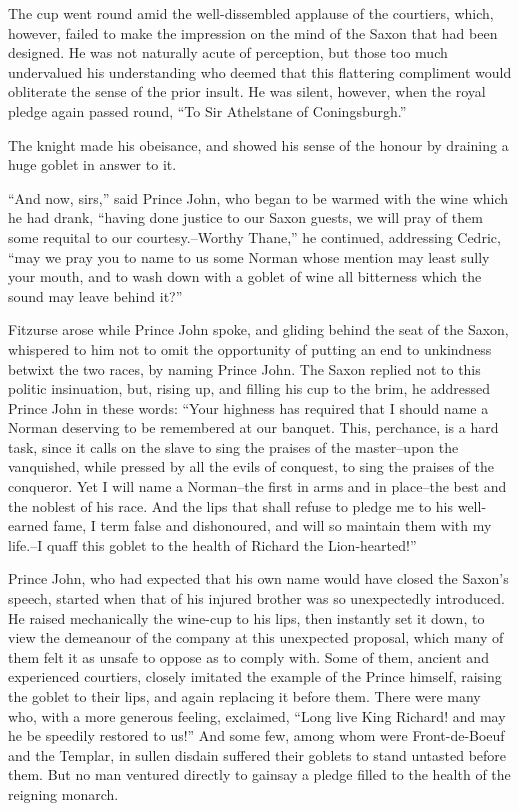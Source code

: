 The cup went round amid the well-dissembled applause of the courtiers,
which, however, failed to make the impression on the mind of the Saxon
that had been designed. He was not naturally acute of perception, but
those too much undervalued his understanding who deemed that this
flattering compliment would obliterate the sense of the prior insult. He
was silent, however, when the royal pledge again passed round, ``To Sir
Athelstane of Coningsburgh.''

The knight made his obeisance, and showed his sense of the honour by
draining a huge goblet in answer to it.

``And now, sirs,'' said Prince John, who began to be warmed with the
wine which he had drank, ``having done justice to our Saxon guests, we
will pray of them some requital to our courtesy.--Worthy Thane,'' he
continued, addressing Cedric, ``may we pray you to name to us some
Norman whose mention may least sully your mouth, and to wash down with a
goblet of wine all bitterness which the sound may leave behind it?''

Fitzurse arose while Prince John spoke, and gliding behind the seat of
the Saxon, whispered to him not to omit the opportunity of putting an
end to unkindness betwixt the two races, by naming Prince John. The
Saxon replied not to this politic insinuation, but, rising up, and
filling his cup to the brim, he addressed Prince John in these words:
``Your highness has required that I should name a Norman deserving to be
remembered at our banquet. This, perchance, is a hard task, since it
calls on the slave to sing the praises of the master--upon the
vanquished, while pressed by all the evils of conquest, to sing the
praises of the conqueror. Yet I will name a Norman--the first in arms
and in place--the best and the noblest of his race. And the lips that
shall refuse to pledge me to his well-earned fame, I term false and
dishonoured, and will so maintain them with my life.--I quaff this
goblet to the health of Richard the Lion-hearted!''

Prince John, who had expected that his own name would have closed the
Saxon's speech, started when that of his injured brother was so
unexpectedly introduced. He raised mechanically the wine-cup to his
lips, then instantly set it down, to view the demeanour of the company
at this unexpected proposal, which many of them felt it as unsafe to
oppose as to comply with. Some of them, ancient and experienced
courtiers, closely imitated the example of the Prince himself, raising
the goblet to their lips, and again replacing it before them. There were
many who, with a more generous feeling, exclaimed, ``Long live King
Richard! and may he be speedily restored to us!'' And some few, among
whom were Front-de-Boeuf and the Templar, in sullen disdain suffered
their goblets to stand untasted before them. But no man ventured
directly to gainsay a pledge filled to the health of the reigning
monarch.

